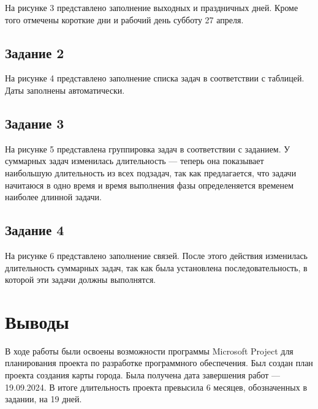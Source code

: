 
На рисунке 3 представлено заполнение выходных и праздничных дней. Кроме того отмечены короткие дни и рабочий день  субботу 27 апреля.


\subsection{Задание 2}
На рисунке 4 представлено заполнение списка задач в соответствии с таблицей. Даты заполнены автоматически.



\subsection{Задание 3}
На рисунке 5 представлена группировка задач в соответствии с заданием.  У суммарных задач изменилась длительность — теперь она показывает наибольшую длительность из всех подзадач, так как предлагается, что задачи начитаюся в одно время и время выполнения фазы   определеняется временем наиболее длинной задачи.



\subsection{Задание 4}
На рисунке 6 представлено заполнение связей. После этого действия изменилась длительность суммарных задач, так как была установлена последовательность, в которой эти задачи должны выполнятся.



\section{Выводы}
В ходе работы были освоены возможности программы Microsoft Project для планирования проекта по разработке программного обеспечения. Был  создан план проекта создания карты города. Была получена дата завершения работ — 19.09.2024. В итоге длительность проекта превысила 6 месяцев, обозначенных в задании, на 19 дней.
